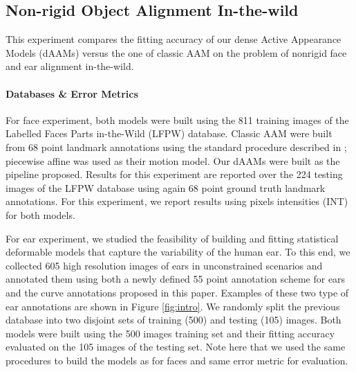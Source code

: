 \subsection{Non-rigid Object Alignment In-the-wild}
\label{exp:daam_benchmark}

This experiment compares the fitting accuracy of our dense Active Appearance Models (dAAMs) versus the one of classic AAM on the problem of nonrigid face and ear alignment in-the-wild. 

\paragraph{Databases \& Error Metrics} For face experiment, both models were built using the 811 training images of the Labelled Faces Parts in-the-Wild (LFPW) \cite{Asthana2014} database. Classic AAM were built from 68 point landmark annotations using the standard procedure described in \cite{Cootes2001,Matthews2004}; piecewise affine was used as their motion model. Our dAAMs were built as the pipeline proposed. Results for this experiment are reported over the 224 testing images of the LFPW database using again 68 point ground truth landmark annotations. For this experiment, we report results using pixels intensities (INT) for both models. 

For ear experiment, we studied the feasibility of building and fitting statistical deformable models that capture the variability of the human ear. To this end, we collected 605 high resolution images of ears in unconstrained scenarios and annotated them using both a newly defined 55 point annotation scheme for ears and the curve annotations proposed in this paper. Examples of these two type of ear annotations are shown in Figure \ref{fig:intro}. We randomly split the previous database into two disjoint sets of training (500) and testing (105) images. Both models were built using the 500 images training set and their fitting accuracy evaluated on the 105 images of the testing set. Note here that we used the same procedures to build the models as for faces and same error metric for evaluation.

